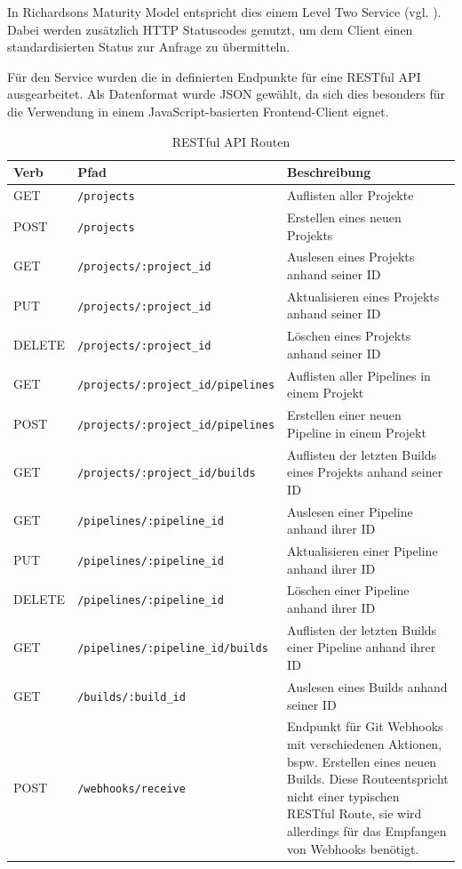 In Richardsons Maturity Model entspricht dies einem Level Two Service (vgl. \citep[20]{Webber2010}). Dabei werden zusätzlich HTTP Statuscodes genutzt, um dem Client einen standardisierten Status zur Anfrage zu übermitteln.

Für den Service wurden die in  definierten Endpunkte für eine RESTful API ausgearbeitet. Als Datenformat wurde JSON gewählt, da sich dies besonders für die Verwendung in einem JavaScript-basierten Frontend-Client eignet.

\begin{table}[H]
  \footnotesize
  \begin{tabularx}{\textwidth}{| l | l | X |}
    \hline
    \textbf{Verb} & \textbf{Pfad} & \textbf{Beschreibung} \\ \hline
    GET & {\scriptsize \texttt{/projects}} & Auflisten aller Projekte \\ \hline
    POST & {\scriptsize \texttt{/projects}} & Erstellen eines neuen Projekts \\ \hline
    GET & {\scriptsize \texttt{/projects/:project\_id}} & Auslesen eines Projekts anhand seiner ID \\ \hline
    PUT & {\scriptsize \texttt{/projects/:project\_id}} & Aktualisieren eines Projekts anhand seiner ID \\ \hline
    DELETE & {\scriptsize \texttt{/projects/:project\_id}} & Löschen eines Projekts anhand seiner ID \\ \hline
    GET & {\scriptsize \texttt{/projects/:project\_id/pipelines}} & Auflisten aller Pipelines in einem Projekt \\ \hline
    POST & {\scriptsize \texttt{/projects/:project\_id/pipelines}} & Erstellen einer neuen Pipeline in einem Projekt \\ \hline
    GET & {\scriptsize \texttt{/projects/:project\_id/builds}} & Auflisten der letzten Builds eines Projekts anhand seiner ID \\ \hline
    GET & {\scriptsize \texttt{/pipelines/:pipeline\_id}} & Auslesen einer Pipeline anhand ihrer ID \\ \hline
    PUT & {\scriptsize \texttt{/pipelines/:pipeline\_id}} & Aktualisieren einer Pipeline anhand ihrer ID \\ \hline
    DELETE & {\scriptsize \texttt{/pipelines/:pipeline\_id}} & Löschen einer Pipeline anhand ihrer ID \\ \hline
    GET & {\scriptsize \texttt{/pipelines/:pipeline\_id/builds}} & Auflisten der letzten Builds einer Pipeline anhand ihrer ID \\ \hline
    GET & {\scriptsize \texttt{/builds/:build\_id}} & Auslesen eines Builds anhand seiner ID \\
    \hline\hline
    POST & {\scriptsize \texttt{/webhooks/receive}} & Endpunkt für Git Webhooks mit verschiedenen Aktionen, bspw. Erstellen eines neuen Builds. Diese Routeentspricht nicht einer typischen RESTful Route, sie wird allerdings für das Empfangen von Webhooks benötigt. \\
    \hline
  \end{tabularx}
  \caption{RESTful API Routen}
  \label{tab:rest-routes}
\end{table}

